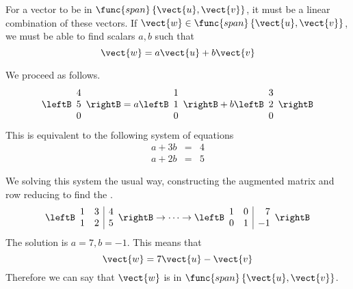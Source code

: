 \begin{solution}
For a vector to be in $\func{span} \left\{ \vect{u}, \vect{v} \right\}$, it must be a linear combination of these vectors. If $\vect{w} \in \func{span} \left\{ \vect{u}, \vect{v} \right\}$, we must be able to find scalars $a,b$ such that\[
\vect{w} = a \vect{u} +b \vect{v}
\]

We proceed as follows.
\[
\leftB \begin{array}{r}
4 \\
5 \\
0
\end{array}
\rightB
=
a 
\leftB \begin{array}{r}
1 \\
1 \\
0
\end{array}
\rightB
+
b
\leftB \begin{array}{r}
3 \\
2 \\
0
\end{array}
\rightB
\]
This is equivalent to the following system of equations
\begin{eqnarray*}
a + 3b &=& 4 \\
a + 2b &=& 5
\end{eqnarray*}

We solving this system the usual way, constructing the augmented matrix and row reducing to find the \rref.
\[
\leftB \begin{array}{rr|r}
1 & 3 & 4 \\
1 & 2 & 5 
\end{array}
\rightB
\rightarrow \cdots \rightarrow
\leftB \begin{array}{rr|r}
1 & 0 & 7 \\
0 & 1 & -1
\end{array}
\rightB
\]
The solution is $a=7, b=-1$. This means that 
\[
\vect{w} = 7 \vect{u} - \vect{v}
\] 
Therefore we can say that $\vect{w}$ is in $\func{span} \left\{ \vect{u}, \vect{v} \right\}$. 
\end{solution}
